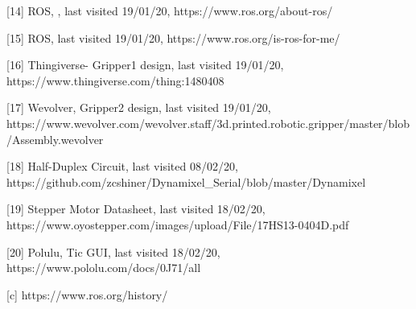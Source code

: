 \documentclass{l4proj}
\begin{document}
[14] ROS, , last visited 19/01/20, https://www.ros.org/about-ros/

[15] ROS, last visited 19/01/20, https://www.ros.org/is-ros-for-me/

[16] Thingiverse- Gripper1 design, last visited 19/01/20, https://www.thingiverse.com/thing:1480408

[17] Wevolver, Gripper2 design, last visited 19/01/20, https://www.wevolver.com/wevolver.staff/3d.printed.robotic.gripper/master/blob/Assembly.wevolver

[18] Half-Duplex Circuit, last visited 08/02/20, https://github.com/zcshiner/Dynamixel_Serial/blob/master/Dynamixel%

[19] Stepper Motor Datasheet, last visited 18/02/20, https://www.oyostepper.com/images/upload/File/17HS13-0404D.pdf

[20] Polulu, Tic GUI, last visited 18/02/20, https://www.pololu.com/docs/0J71/all 

[c] https://www.ros.org/history/
\end{document}

